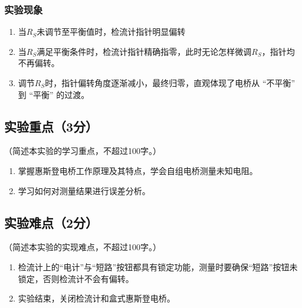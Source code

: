 \documentclass[]{../../templates/Report}%
\begin{document}
\subsubsection{实验现象}

\begin{enumerate}
    \item 当\(R_S\)未调节至平衡值时，检流计指针明显偏转
    \item 当\(R_S\)满足平衡条件时，检流计指针精确指零，此时无论怎样微调\(R_S\)，指针均不再偏转。
    \item 调节\(R_S\)时，指针偏转角度逐渐减小，最终归零，直观体现了电桥从 “不平衡” 到 “平衡” 的过渡。
\end{enumerate}

\subsection{实验重点（3分）}
（简述本实验的学习重点，不超过100字。）
\begin{enumerate}
    \item 掌握惠斯登电桥工作原理及其特点，学会自组电桥测量未知电阻。
    \item 学习如何对测量结果进行误差分析。
\end{enumerate}
\subsection{实验难点（2分）}
（简述本实验的实现难点，不超过100字。）
\begin{enumerate}
    \item  检流计上的“电计”与“短路”按钮都具有锁定功能，测量时要确保“短路”按钮未锁定，否则检流计不会有偏转。
    \item 实验结束，关闭检流计和盒式惠斯登电桥。
\end{enumerate}
\end{document}
